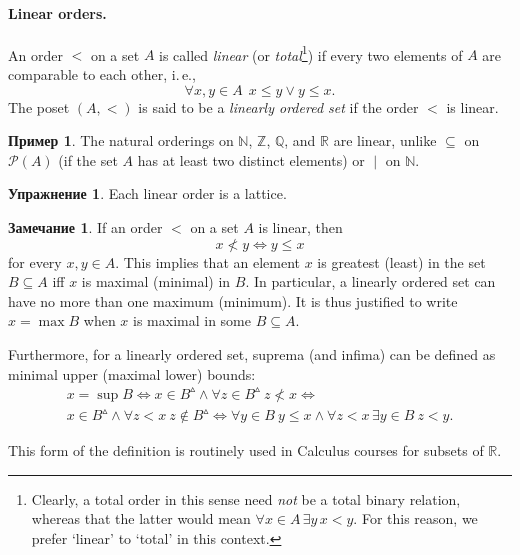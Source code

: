 \documentclass[12pt,notitlepage]{article}
\theoremstyle{plain}
\theoremstyle{definition}
\newtheorem{exc}[thm]{Упражнение}
\newtheorem{exm}[thm]{Пример}
\newtheorem{rem}[thm]{Замечание}
\theoremstyle{plain}
\newcommand{\N}{\mathbb{N}}
\newcommand{\Z}{\mathbb{Z}}
\newcommand{\Q}{\mathbb{Q}}
\newcommand{\R}{\mathbb{R}}
\newcommand{\sbs}{\subseteq}
\newcommand{\mP}{\mathcal{P}}
\newcommand{\1}{\mathbf{1}}
\newcommand{\0}{\mathbf{0}}
\newcommand{\dvd}{\mathop{\mid}}
\newcommand{\mcomm}[1]{}
\begin{document}
\paragraph{Linear orders.} An order ${<}$ on a set $A$ is called \emph{linear} (or \emph{total}\footnote{Clearly, a total order in this sense need \emph{not} be a total binary relation, whereas that the latter would mean $\forall x \in A\, \exists y\, x < y$. For this reason, we prefer `linear' to `total' in this context.}) if every two elements of $A$ are comparable to each other, i.\,e.,
$$\forall x, y \in A\ \ x \leq y \vee y \leq x.$$
The poset $(A,<)$ is said to be a \emph{linearly ordered set} if the order ${<}$ is linear.

\begin{exm}
	The natural orderings on $\N$, $\Z$, $\Q$, and $\R$ are linear, unlike ${\sbs}$ on $\mP (A)$ (if the set $A$ has at least two distinct elements) or ${\dvd}$ on $\N$.
\end{exm}

\begin{exc}
	Each linear order is a lattice.
\end{exc}

\begin{rem}
	If an order ${<}$ on a set $A$ is linear, then
	$$x \nless y \iff y \leq x$$
	for every $x, y \in A$. This implies that an element $x$ is greatest (least) in the set $B \sbs A$ iff $x$ is maximal (minimal) in $B$. In particular, a linearly ordered set can have no more than one maximum (minimum). It is thus justified to write $x = \max B$ when $x$ is maximal in some $B \sbs A$.
	
	\mcomm{It is important to show the students that `our' supremum is just a general version of what they may have come across in their Calculus course.}
	
	Furthermore, for a linearly ordered set, suprema (and infima) can be defined as minimal upper (maximal lower) bounds:
	\begin{multline*}
		x = \sup B \iff  x \in B^\vartriangle \wedge \forall z \in B^\vartriangle\ z \nless x \iff\\
		x \in B^\vartriangle \wedge \forall z < x\ z \notin B^\vartriangle \iff
		\forall y\in B\ y \leq x \wedge \forall z < x\, \exists y \in B\ z < y.
	\end{multline*}
\end{rem}
\noindent This form of the definition is routinely used in Calculus courses for subsets of $\R$.

\end{document}

